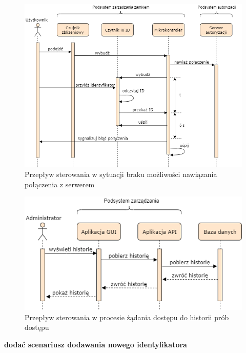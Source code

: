             \begin{figure}[]
                \includegraphics[width=\linewidth]{chapters/images/sequence3.png}
                \caption{Przepływ sterowania w sytuacji braku możliwości nawiązania połączenia z serwerem}
                \label{fig:sequence3}
            \end{figure}

            \begin{figure}[]
                \centering
                \includegraphics[width=.7\linewidth]{chapters/images/sequence4.png}
                \caption{Przepływ sterowania w procesie żądania dostępu do historii prób dostępu}
                \label{fig:sequence4}
            \end{figure}

            \textbf{dodać scenariusz dodawania nowego identyfikatora}




